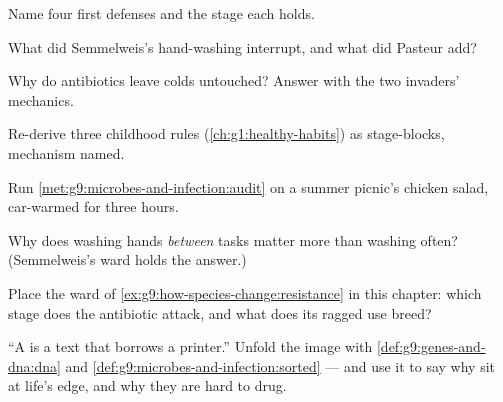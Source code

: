 \begin{exercise}[$\star$]\label{exo:g9:microbes-and-infection:5}
Name four first defenses and the stage each holds.
\end{exercise}

\begin{exercise}[$\star$]\label{exo:g9:microbes-and-infection:6}
What did Semmelweis's hand-washing interrupt, and what
did Pasteur add?
\end{exercise}

\begin{exercise}[$\star\star$]\label{exo:g9:microbes-and-infection:7}
Why do antibiotics leave colds untouched? Answer with the
two invaders' mechanics.
\end{exercise}

\begin{exercise}[$\star\star$]\label{exo:g9:microbes-and-infection:8}
Re-derive three childhood  rules
(\cref{ch:g1:healthy-habits}) as stage-blocks, mechanism
named.
\end{exercise}

\begin{exercise}[$\star\star$]\label{exo:g9:microbes-and-infection:9}
Run \cref{met:g9:microbes-and-infection:audit} on a
summer picnic's chicken salad, car-warmed for three
hours.
\end{exercise}

\begin{exercise}[$\star\star$]\label{exo:g9:microbes-and-infection:10}
Why does washing hands \emph{between} tasks matter more
than washing often? (Semmelweis's ward holds the
answer.)
\end{exercise}

\begin{exercise}[$\star\star$]\label{exo:g9:microbes-and-infection:11}
Place the ward of
\cref{ex:g9:how-species-change:resistance} in this
chapter: which stage does the antibiotic attack, and
what does its ragged use breed?
\end{exercise}

\begin{exercise}[$\star\star\star$]\label{exo:g9:microbes-and-infection:12}
``A  is a text that borrows a printer.'' Unfold the
image with \cref{def:g9:genes-and-dna:dna} and
\cref{def:g9:microbes-and-infection:sorted} --- and use
it to say why  sit at life's edge, and why they
are hard to drug.
\end{exercise}


